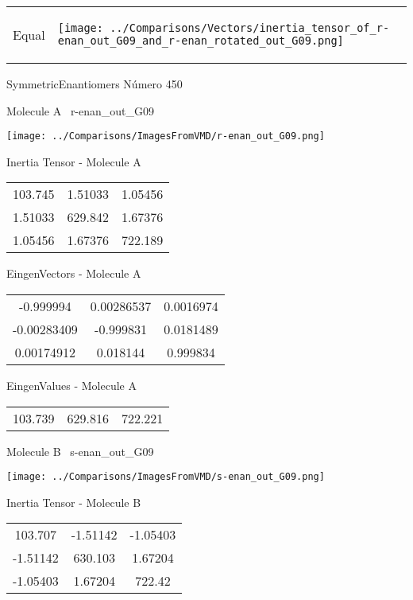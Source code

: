 \vtab[-5mm]
\begin{tabular}{*{2}{m{}}}
\begin{center}
\textcolor{NavyBlue}{\Large Equal}
\end{center}
&
\begin{center}
\texttt{[image: ../Comparisons/Vectors/inertia\_tensor\_of\_r-enan\_out\_G09\_and\_r-enan\_rotated\_out\_G09.png]}
\end{center}
\end{tabular}

 \newpage

\vtab[-3cm]
\begin{center}
{\large SymmetricEnantiomers \tab Número 450}
\end{center}
\begin{multicols}{2}
\begin{center}

Molecule A \
r-enan\_out\_G09

\texttt{[image: ../Comparisons/ImagesFromVMD/r-enan\_out\_G09.png]}

Inertia Tensor - Molecule A \\
\begin{tabular}{|c c c|}
103.745	 & 	1.51033	 & 	1.05456	 \\
1.51033	 & 	629.842	 & 	1.67376	 \\
1.05456	 & 	1.67376	 & 	722.189
\end{tabular}

\vtab
 EingenVectors - Molecule A     \\
\begin{tabular}{|c c c|}
-0.999994	 & 	0.00286537	 & 	0.0016974	 \\
-0.00283409	 & 	-0.999831	 & 	0.0181489	 \\
0.00174912	 & 	0.018144	 & 	0.999834
\end{tabular}

\vtab
 EingenValues - Molecule A     \\
\begin{tabular}{|c c c|}
103.739	 & 	629.816	 & 	722.221	 \\
\end{tabular}
\columnbreak

Molecule B \
s-enan\_out\_G09

\texttt{[image: ../Comparisons/ImagesFromVMD/s-enan\_out\_G09.png]}

Inertia Tensor - Molecule B \\
\begin{tabular}{|c c c|}
103.707	 & 	-1.51142	 & 	-1.05403	 \\
-1.51142	 & 	630.103	 & 	1.67204	 \\
-1.05403	 & 	1.67204	 & 	722.42
\end{tabular}


\end{center}
\end{multicols}
